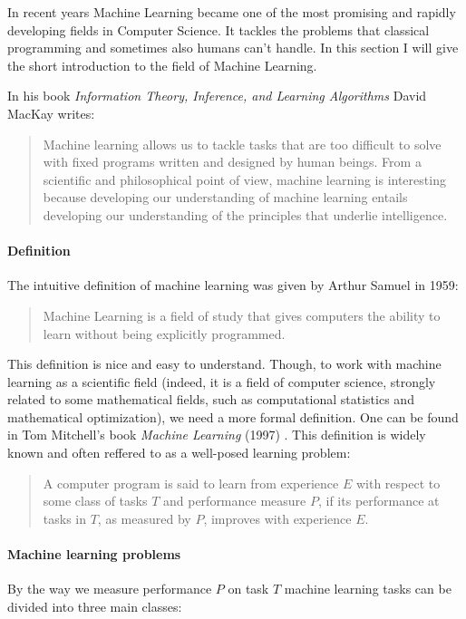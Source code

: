 In recent years Machine Learning became one of the most promising and rapidly developing fields in Computer Science. It tackles the problems that classical programming and sometimes also humans can't handle. In this section I will give the short introduction to the field of Machine Learning.

In his book \textit{Information Theory, Inference, and Learning Algorithms} \cite{MacKay-2003} David MacKay writes:
  \begin{quote}
    Machine learning allows us to tackle tasks that are too diﬃcult to solve with fixed programs written and designed by human beings. From a scientiﬁc and philosophical point of view, machine learning is interesting because developing our understanding of machine learning entails developing our understanding of the principles that underlie intelligence.
  \end{quote}
  
  \paragraph{Definition}
  The intuitive definition of machine learning was given by Arthur Samuel in 1959:
  
  \begin{quote}
    Machine Learning is a field of study that gives computers the ability to learn without being explicitly programmed.
  \end{quote}
  
  This definition is nice and easy to understand. Though, to work with machine learning as a scientific field (indeed, it is a field of computer science, strongly related to some mathematical fields, such as computational statistics and mathematical optimization), we need a more formal definition. One can be found in Tom Mitchell's book \textit{Machine Learning} (1997) \cite{Mitchell-1997}. This definition is widely known and often reffered to as a well-posed learning problem:
  
  \begin{quote}
  A computer program is said to learn from experience $ E $ with respect to some class of tasks $ T $ and performance measure $ P $, if its performance at tasks in $ T $, as measured by $ P $, improves with experience $ E $.
  \end{quote}
  
  \paragraph{Machine learning problems}
  By the way we measure performance $ P $ on task $ T $ machine learning tasks can be divided into three main classes:
  

